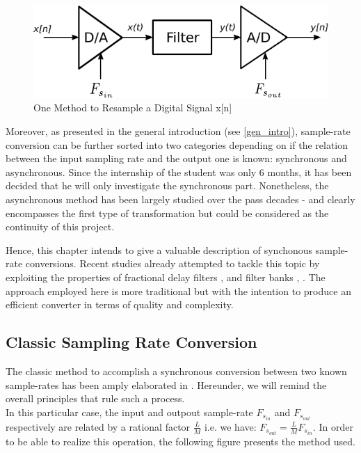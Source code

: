 \begin{figure}[th]
	\centering
	\includegraphics[scale = 1]{datoad.pdf}
	\caption{One Method to Resample a Digital Signal x[n]}\label{Figure 3.2}
\end{figure}

Moreover, as presented in the general introduction (see \ref{gen_intro}), sample-rate conversion can be further sorted into two categories depending on if the relation between the input sampling rate and the output one is known: synchronous and asynchronous. Since the internship of the student was only 6 months, it has been decided that he will only investigate the synchronous part. Nonetheless, the asynchronous method has been largely studied over the pass decades \cite{async1}-\nocite{async2}\cite{async3} and clearly encompasses the first type of transformation but could be considered as the continuity of this project.

Hence, this chapter intends to give a valuable description of synchonous sample-rate conversions. Recent studies already attempted to tackle this topic by exploiting the properties of fractional delay filters \cite{fract1}, \cite{fract2} and filter banks \cite{filtbanks1}, \cite{filtbanks2}. The approach employed here is more traditional but with the intention to produce an efficient converter in terms of quality and complexity.


\newpage

\subsection{Classic Sampling Rate Conversion} \label{section 3.1.2}

The classic method to accomplish a synchronous conversion between two known sample-rates has been amply elaborated in \cite{Oppenheim}. Hereunder, we will remind the overall principles that rule such a process.\\

In this particular case, the input and outpout sample-rate $F_{s_{in}}$ and $F_{s_{out}}$ respectively are related by a rational factor $\frac{L}{M}$ i.e. we have: $F_{s_{out}}= \frac{L}{M} F_{s_{in}}$. In order to be able to realize this operation, the following figure presents the method used. 

